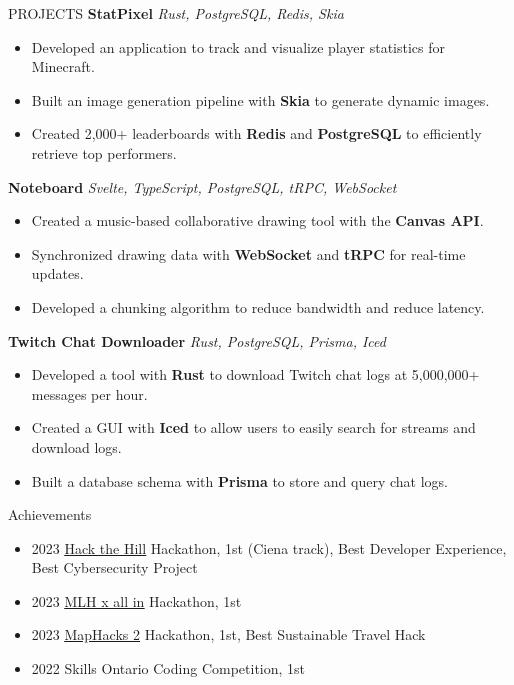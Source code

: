 \documentclass{resume}
\begin{document}
\vspace{-8pt}

\begin{rSection}{PROJECTS}
	\textbf{StatPixel} \textit{Rust, PostgreSQL, Redis, Skia}
	\vspace{-8pt}
	\begin{itemize}
		\itemsep -6pt {}
		\item Developed an application to track and visualize player statistics for Minecraft.
		\item Built an image generation pipeline with \textbf{Skia} to generate dynamic images.
		\item Created 2,000+ leaderboards with \textbf{Redis} and \textbf{PostgreSQL} to efficiently retrieve top performers.
	\end{itemize}

	\textbf{Noteboard} \textit{Svelte, TypeScript, PostgreSQL, tRPC, WebSocket}
	\vspace{-8pt}
	\begin{itemize}
		\itemsep -6pt {}
		\item Created a music-based collaborative drawing tool with the \textbf{Canvas API}.
		\item Synchronized drawing data with \textbf{WebSocket} and \textbf{tRPC} for real-time updates.
		\item Developed a chunking algorithm to reduce bandwidth and reduce latency.
	\end{itemize}

	\textbf{Twitch Chat Downloader} \textit{Rust, PostgreSQL, Prisma, Iced}
	\vspace{-8pt}
	\begin{itemize}
		\itemsep -6pt {}
		\item Developed a tool with \textbf{Rust} to download Twitch chat logs at 5,000,000+ messages per hour.
		\item Created a GUI with \textbf{Iced} to allow users to easily search for streams and download logs.
		\item Built a database schema with \textbf{Prisma} to store and query chat logs.
	\end{itemize}
\end{rSection}

\begin{rSection}{Achievements}
	\begin{itemize}
		\itemsep -6pt {}
		\item	2023 \underline{\href{https://hack-the-hill.devpost.com}{Hack the Hill}} Hackathon, 1st (Ciena track), Best Developer Experience, Best Cybersecurity Project
		\item 2023 \underline{\href{https://all-in-hackathon.devpost.com/}{MLH x \textbraceleft all in\textbraceright}} Hackathon, 1st
		\item 2023 \underline{\href{https://maphacks-2.devpost.com}{MapHacks 2}} Hackathon, 1st, Best Sustainable Travel Hack
		\item	2022 Skills Ontario Coding Competition, 1st
	\end{itemize}
\end{rSection}
\end{document}
